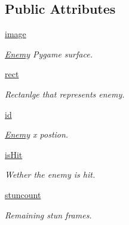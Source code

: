 \subsection*{Public Attributes}
\begin{DoxyCompactItemize}
\item 
\mbox{\label{classactor_1_1enemy_1_1_enemy_aa1cb2b099f1405c72c5aead1f72ca273}} 
\hyperlink{classactor_1_1enemy_1_1_enemy_aa1cb2b099f1405c72c5aead1f72ca273}{image}
\begin{DoxyCompactList}\small\item\em \hyperlink{classactor_1_1enemy_1_1_enemy}{Enemy} Pygame surface. \end{DoxyCompactList}\item 
\mbox{\label{classactor_1_1enemy_1_1_enemy_aea251391a575a128f97cfd1806311f1e}} 
\hyperlink{classactor_1_1enemy_1_1_enemy_aea251391a575a128f97cfd1806311f1e}{rect}
\begin{DoxyCompactList}\small\item\em Rectanlge that represents enemy. \end{DoxyCompactList}\item 
\hyperlink{classactor_1_1enemy_1_1_enemy_a0e6ba00fdf6dd7aba8b872f7b21040a7}{id}
\begin{DoxyCompactList}\small\item\em \hyperlink{classactor_1_1enemy_1_1_enemy}{Enemy} x postion. \end{DoxyCompactList}\item 
\mbox{\label{classactor_1_1enemy_1_1_enemy_ac706787533eed329ba4d3f69018dfd4f}} 
\hyperlink{classactor_1_1enemy_1_1_enemy_ac706787533eed329ba4d3f69018dfd4f}{is\+Hit}
\begin{DoxyCompactList}\small\item\em Wether the enemy is hit. \end{DoxyCompactList}\item 
\mbox{\label{classactor_1_1enemy_1_1_enemy_a682e04fb5525441486f5ecfdd1a2d879}} 
\hyperlink{classactor_1_1enemy_1_1_enemy_a682e04fb5525441486f5ecfdd1a2d879}{stuncount}
\begin{DoxyCompactList}\small\item\em Remaining stun frames. \end{DoxyCompactList}\item 

\end{DoxyCompactItemize}
